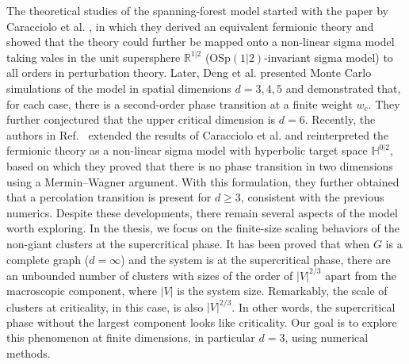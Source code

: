 The theoretical studies of the spanning-forest model started with the paper by Caracciolo et al. \cite{Caracciolo2004}, in which they derived
an equivalent fermionic theory and showed that the theory could further be mapped onto a non-linear sigma model taking vales in the unit supersphere
$\mathbb{R}^{1|2}$ ($\text{OSp}(1|2)$-invariant sigma model) to all orders in perturbation theory. 
Later, Deng et al.\cite{Deng2007} presented Monte Carlo simulations of the model in spatial dimensions $d = 3, 4, 5$ and demonstrated that, for each case, there is a second-order phase transition at a finite weight
$w_c$. They further conjectured that the upper critical dimension is $d=6$. Recently, the authors in Ref.~ extended the results
of Caracciolo et al. and reinterpreted the fermionic theory as a non-linear sigma model with hyperbolic target space $\mathbb{H}^{0|2}$, based on which
they proved that there is no phase transition in two dimensions using a Mermin–Wagner argument. With this formulation, they further
obtained \cite{Roland2021Percolation} that a percolation transition is present for $d \geq 3$, consistent with the previous numerics. Despite these developments, there remain several aspects of
the model worth exploring. In the thesis, we focus on the finite-size scaling behaviors of the non-giant clusters at the supercritical phase.
It has been proved that \cite{Luczak1992,Martin2018} when $G$ is a complete graph ($d=\infty$) and the system is at the supercritical phase, there are an unbounded number of clusters with sizes of the order of $|V|^{2/3}$ apart from the macroscopic component,
where $|V|$ is the system size. Remarkably, the scale of clusters at criticality, in this case, is also $|V|^{2/3}$. In other words, the supercritical
phase without the largest component looks like criticality. Our goal is to explore this phenomenon at finite dimensions, in particular $d=3$, using numerical methods.

